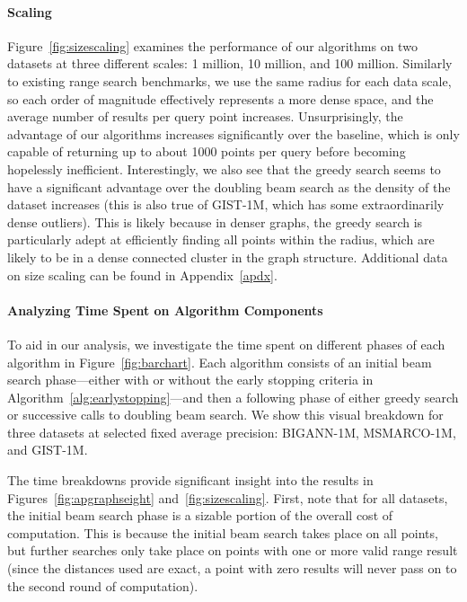 \paragraph{Scaling} Figure~\ref{fig:sizescaling} examines the performance of our algorithms on two datasets at three different scales: 1 million, 10 million, and 100 million. Similarly to existing range search benchmarks, we use the same radius for each data scale, so each order of magnitude effectively represents a more dense space, and the average number of results per query point increases. Unsurprisingly, the advantage of our algorithms increases significantly over the baseline, which is only capable of returning up to about 1000 points per query before becoming hopelessly inefficient. Interestingly, we also see that the greedy search seems to have a significant advantage over the doubling beam search as the density of the dataset increases (this is also true of GIST-1M, which has some extraordinarily dense outliers). This is likely because in denser graphs, the greedy search is particularly adept at efficiently finding all points within the radius, which are likely to be in a dense connected cluster in the graph structure. Additional data on size scaling can be found in Appendix~\ref{apdx}.

\paragraph{Analyzing Time Spent on Algorithm Components} To aid in our analysis, we investigate the time spent on different phases of each algorithm in Figure~\ref{fig:barchart}. Each algorithm consists of an initial beam search phase---either with or without the early stopping criteria in Algorithm~\ref{alg:earlystopping}---and then a following phase of either greedy search or successive calls to doubling beam search. We show this visual breakdown for three datasets at selected fixed average precision: BIGANN-1M, MSMARCO-1M, and GIST-1M. 

The time breakdowns provide significant insight into the results in Figures~\ref{fig:apgraphseight} and~\ref{fig:sizescaling}. First, note that for all datasets, the initial beam search phase is a sizable portion of the overall cost of computation. This is because the initial beam search takes place on all points, but further searches only take place on points with one or more valid range result (since the distances used are exact, a point with zero results will never pass on to the second round of computation). 

